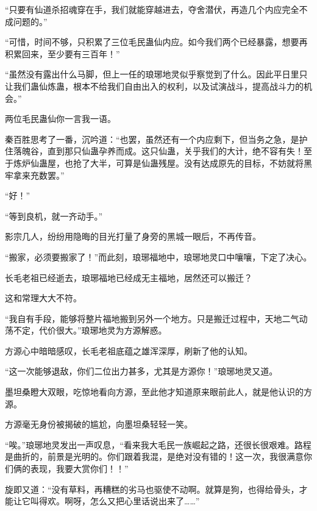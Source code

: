 \begin{this_body}
“只要有仙道杀招魂穿在手，我们就能穿越进去，夺舍潜伏，再造几个内应完全不成问题的。”

“可惜，时间不够，只积累了三位毛民蛊仙内应。如今我们两个已经暴露，想要再积累回来，至少要有三百年！”

“虽然没有露出什么马脚，但上一任的琅琊地灵似乎察觉到了什么。因此平日里只让我们蛊仙炼蛊，根本不给我们自由出入的权利，以及试演战斗，提高战斗力的机会。”

两位毛民蛊仙你一言我一语。

秦百胜思考了一番，沉吟道：“也罢，虽然还有一个内应剩下，但当务之急，是护住落魄谷，直到那只仙蛊孕养而成。这只仙蛊，关乎我们的大计，绝不容有失！至于炼炉仙蛊屋，也抢了大半，可算是仙蛊残屋。没有达成原先的目标，不妨就将黑牢拿来充数罢。”

“好！”

“等到良机，就一齐动手。”

影宗几人，纷纷用隐晦的目光打量了身旁的黑城一眼后，不再传音。

“搬家，必须要搬家了！”而此刻，琅琊福地中，琅琊地灵口中嚷嚷，下定了决心。

长毛老祖已经逝去，琅琊福地已经成无主福地，居然还可以搬迁？

这和常理大大不符。

“我自有手段，能够将整片福地搬到另外一个地方。只是搬迁过程中，天地二气动荡不定，代价很大。”琅琊地灵为方源解惑。

方源心中暗暗感叹，长毛老祖底蕴之雄浑深厚，刷新了他的认知。

“这一次能够退敌，你们二位出力甚多，尤其是方源你！”琅琊地灵又道。

墨坦桑瞪大双眼，吃惊地看向方源，至此他才知道原来眼前此人，就是他认识的方源。

方源毫无身份被揭破的尴尬，向墨坦桑轻轻一笑。

“唉。”琅琊地灵发出一声叹息，“看来我大毛民一族崛起之路，还很长很艰难。路程是曲折的，前景是光明的。你们跟着我混，是绝对没有错的！这一次，我很满意你们俩的表现，我要大赏你们！！”

旋即又道：“没有草料，再糟糕的劣马也驱使不动啊。就算是狗，也得给骨头，才能让它叫得欢。啊呀，怎么又把心里话说出来了……”

\end{this_body}

